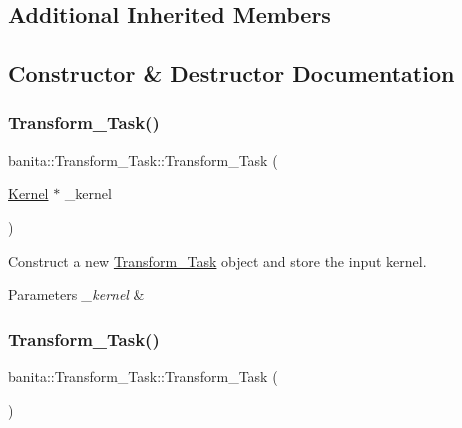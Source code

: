 \subsection*{Additional Inherited Members}


\subsection{Constructor \& Destructor Documentation}
\mbox{\label{classbanita_1_1_transform___task_aaf63d287eb134e3e8c8ad5f8ef792d43}} 
\subsubsection{\texorpdfstring{Transform\_Task()}{Transform\_Task()}\hspace{0.1cm}{\footnotesize\ttfamily [1/2]}}
{\footnotesize\ttfamily banita\+::\+Transform\+\_\+\+Task\+::\+Transform\+\_\+\+Task (\begin{DoxyParamCaption}\item[{\mbox{\hyperlink{classbanita_1_1_kernel}{Kernel}} $\ast$}]{\+\_\+kernel }\end{DoxyParamCaption})\hspace{0.3cm}{\ttfamily [inline]}}



Construct a new \mbox{\hyperlink{classbanita_1_1_transform___task}{Transform\+\_\+\+Task}} object and store the input kernel. 


\begin{DoxyParams}{Parameters}
{\em \+\_\+kernel} & \\
\hline
\end{DoxyParams}
\mbox{\label{classbanita_1_1_transform___task_ad475757b8d3298a37f4b89cc81b72b1f}} 
\subsubsection{\texorpdfstring{Transform\_Task()}{Transform\_Task()}\hspace{0.1cm}{\footnotesize\ttfamily [2/2]}}
{\footnotesize\ttfamily banita\+::\+Transform\+\_\+\+Task\+::\+Transform\+\_\+\+Task (\begin{DoxyParamCaption}{ }\end{DoxyParamCaption})\hspace{0.3cm}{\ttfamily [inline]}}



